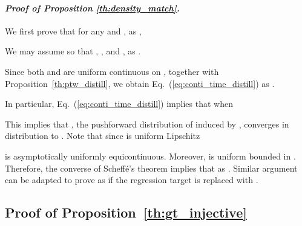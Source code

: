 \documentclass{article} \usepackage{iclr2024_coNFErence,times}
\def\eqref#1{equation~\ref{#1}}
\newenvironment{myproof}[2]{\paragraph{\textit{Proof of {#1} {#2}. }}}{\hfill}
\def\eqref#1{(\ref{#1})}
\def\eqref#1{(\ref{#1})}
\theoremstyle{definition}
\theoremstyle{remark}
\begin{document}
\begin{myproof}{Proposition}{\ref{th:density_match}}
    We first prove that for any  and , as ,
    
      We may assume  so that , , and ,  as .
    
Since both  and  are uniform continuous on , together with Proposition~\ref{th:ptw_distill}, we obtain Eq.~\eqref{eq:conti_time_distill} as .

     In particular, Eq.~\eqref{eq:conti_time_distill} implies that when 
    
    
    This implies that , the pushforward distribution of  induced by , converges in distribution to . Note that since  is uniform Lipschitz
    
     is asymptotically uniformly equicontinuous.  Moreover,  is uniform bounded in . Therefore, the converse of Scheff\'e's theorem
    \citep{boos1985converse,sweeting1986converse} implies that  as . Similar argument can be adapted to prove  as  if the regression target  is replaced with .
\end{myproof}



\subsection{Proof of Proposition~\ref{th:gt_injective}}
\end{document}

